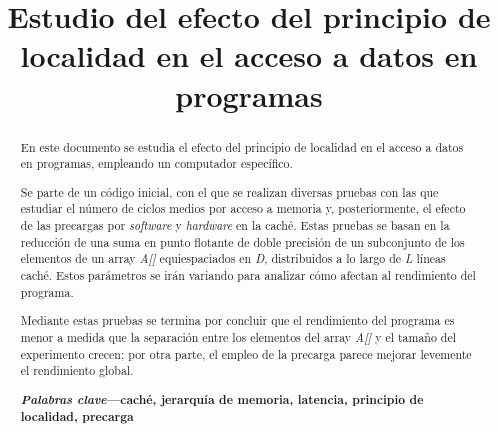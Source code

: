 \documentclass[conference]{IEEEtran}
\begin{document}
\def\UrlBreaks{\do\/\do-\do\_} %

\title{Estudio del efecto del principio de localidad en el acceso a datos en programas\\
}

\author{
\and
{}
}

\maketitle

\thispagestyle{plain}
\pagestyle{plain}

\begin{abstract}
En este documento se estudia el efecto del principio de localidad en el acceso a datos en programas, empleando un computador específico. 

Se parte de un código inicial, con el que se realizan diversas pruebas con las que estudiar el número de ciclos medios por acceso a memoria y, posteriormente, el efecto de las precargas por \textit{software} y \textit{hardware} en la caché. Estas pruebas se basan en la reducción de una suma en punto flotante de doble precisión de un subconjunto de los elementos de un array \textit{A[]} equiespaciados en \textit{D}, distribuidos a lo largo de \textit{L} líneas caché. Estos parámetros se irán variando para analizar cómo afectan al rendimiento del programa.

Mediante estas pruebas se termina por concluir que el rendimiento del programa es menor a medida que la separación entre los elementos del array \textit{A[]} y el tamaño del experimento crecen; por otra parte, el empleo de la precarga parece mejorar levemente el rendimiento global.

\textbf{\textit{Palabras clave}---caché, jerarquía de memoria, latencia, principio de localidad, precarga}
\end{abstract}
\end{document}
